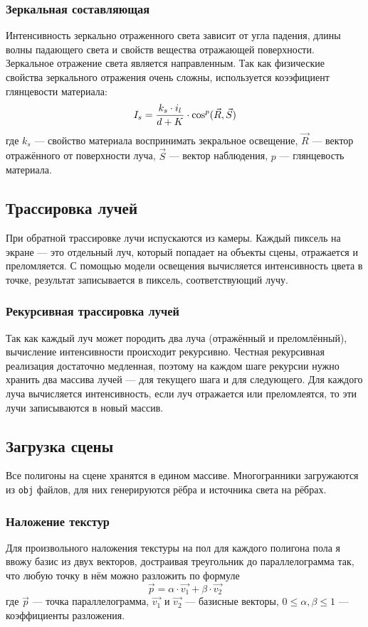 \subsubsection{Зеркальная составляющая}
Интенсивность зеркально отраженного света зависит от угла падения, длины волны падающего света и свойств вещества отражающей поверхности. Зеркальное отражение света является направленным. Так как физические свойства зеркального отражения очень сложны, используется коээфициент глянцевости материала:
$$ I_s = {{k_s \cdot i_l} \over {d + K}} \cdot {\cos ^ p}(\vec{R}, \vec{S}) $$
где $k_s$ --- свойство материала воспринимать зекральное освещение, $\vec{R}$ --- вектор отражённого от поверхности луча, $\vec{S}$ --- вектор наблюдения, $p$ --- глянцевость материала.

\subsection{Трассировка лучей}
При обратной трассировке лучи испускаются из камеры. Каждый пиксель на экране --- это отдельный луч, который попадает на объекты сцены, отражается и преломляется. С помощью модели освещения вычисляется интенсивность цвета в точке, результат записывается в пиксель, соответствующий лучу.

\subsubsection{Рекурсивная трассировка лучей}
Так как каждый луч может породить два луча (отражённый и преломлённый), вычисление интенсивности происходит рекурсивно. Честная рекурсивная реализация достаточно медленная, поэтому на каждом шаге рекурсии нужно хранить два массива лучей --- для текущего шага и для следующего. Для каждого луча вычисляется интенсивность, если луч отражается или преломлеятся, то эти лучи записываются в новый массив.

\subsection{Загрузка сцены}
Все полигоны на сцене хранятся в едином массиве. Многогранники загружаются из \texttt{obj} файлов, для них генерируются рёбра и источника света на рёбрах.

\subsubsection{Наложение текстур}
Для произвольного наложения текстуры на пол для каждого полигона пола я ввожу базис из двух векторов, достраивая треугольник до параллелограмма так, что любую точку в нём можно разложить по формуле
$$ \vec{p} = \alpha \cdot \vec{v_1} + \beta \cdot \vec{v_2} $$
где $\vec{p}$ --- точка параллелограмма, $\vec{v_1}$ и $\vec{v_2}$ --- базисные векторы, $0 \le \alpha, \beta \le 1$ --- коэффициенты разложения.

